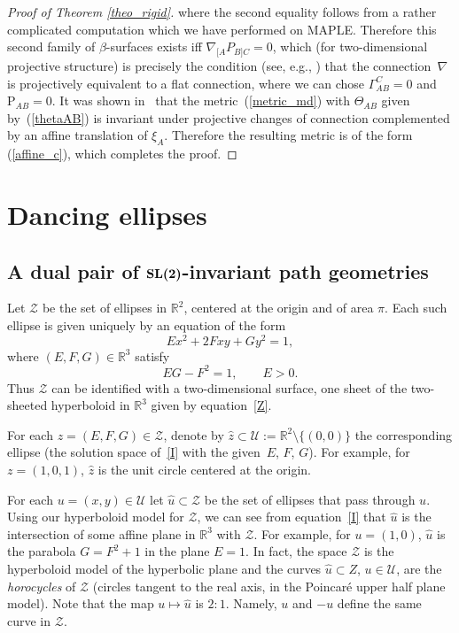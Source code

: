 \documentclass[pdftex]{sigma}%
\numberwithin{equation}{section}
\newcommand{\Z}{\mathbb{Z}}
\newcommand{\R}{\mathbb{R}}
\newcommand{\Rho}{\mathrm{P}}
\def\be{\begin{equation}}
\def\ee{\end{equation}}
\renewcommand{\Z}{\mathcal{Z}}
\newcommand{\U}{\mathcal{U}}
\newcommand{\uh}{\widehat{u}}
\newcommand{\zh}{\widehat{z}}
\begin{document}
\begin{proof}[Proof of Theorem \ref{theo_rigid}]
where the second equality follows from a rather complicated computation which
we have performed on MAPLE. Therefore this second family of $\beta$-surfaces
exists iff $\nabla_{[A}P_{B]C}=0$, which (for two-dimensional projective structure) is precisely the condition (see, e.g., \cite{BDE}) that the
connection~$\nabla$ is projectively
equivalent to a flat connection, where we can chose
 $\Gamma_{AB}^C=0$ and $\Rho_{AB}=0$. It was shown in~\cite{DM} that
the metric~(\ref{metric_md}) with $\Theta_{AB}$ given by~(\ref{thetaAB})
is invariant under projective changes of connection complemented by an affine
translation of $\xi_A$. Therefore the resulting metric is of the form
(\ref{affine_c}), which completes the proof.
\end{proof}

\section{Dancing ellipses}\label{section4}

\subsection[A dual pair of SL(2)-invariant path geometries]{A dual pair of $\boldsymbol{{\rm SL}(2)}$-invariant path geometries}

Let $\Z$ be the set of ellipses in $\R^2$, centered at the origin and of area $\pi$. Each such ellipse is given uniquely by an equation of the form
\be\label{I}
Ex^2+2Fxy+Gy^2=1,
\ee
where $(E,F,G)\in \R^3$ satisfy
\be\label{Z}
EG-F^2=1, \qquad E>0.
\ee
Thus $\Z$ can be identified with a two-dimensional surface, one sheet of the two-sheeted hyperboloid in $\R^3$ given by equation~\eqref{Z}.

For each $z=(E,F,G)\in \Z$, denote by $\zh\subset \U:=\R^2\setminus \{(0,0)\}$ the corresponding ellipse (the solution space of~\eqref{I} with the given~$E$, $F$, $G$). For example, for $z=(1,0,1)$, $\zh$ is the unit circle centered at the origin.

For each $u=(x,y)\in\U$ let $\uh\subset \Z$ be the set of ellipses that pass through $u$. Using our hyperboloid model for $\Z$, we can see from equation~\eqref{I} that $\uh$ is the intersection of some affine plane in $\R^3$ with $\Z$. For example, for $u=(1,0)$,
$\uh$ is the parabola $G=F^2+1$ in the plane $E=1$.
In fact, the space $\Z$ is the hyperboloid model of the hyperbolic plane and the curves $\uh\subset Z$, $u\in\U$, are the {\em horocycles} of $\Z$ (circles tangent to the real axis, in the Poincar\'e upper half plane model).
Note that the map $u\mapsto\uh$ is $2:1$. Namely, $u$ and $-u$ define the same curve in $\Z$.
\end{document}
